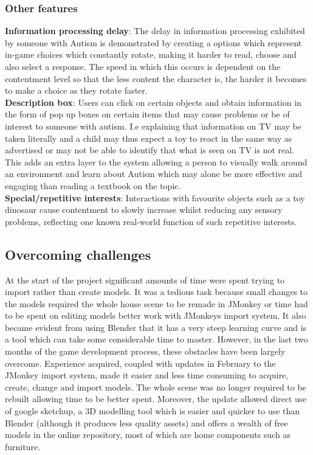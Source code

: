 \documentclass[11pt]{report}
\begin{document}
\subsubsection{Other features}
\textbf{Information processing delay}: The delay in information processing exhibited by someone with Autism is demonstrated by creating a options which represent in-game choices which constantly rotate, making it harder
to read, choose and also select a response. The speed in which this occurs is dependent on the contentment level so that the less content the character is, the harder it becomes to make a choice as they rotate faster. \\

\textbf{Description box}: Users can click on certain objects and obtain information in the form of pop up boxes on certain items that may cause problems or be of interest to someone with autism. I.e explaining that information on
TV may be taken literally and a child may thus expect a toy to react in the same way as advertised or may not be able to identify that what is seen on TV is not real. This adds an extra layer to the system allowing a person
to visually walk around an environment and learn about Autism which may alone be more effective and engaging than reading a textbook on the topic. \\

\textbf{Special/repetitive interests}: Interactions with favourite objects such as a toy dinosaur cause contentment to slowly increase whilst reducing any sensory problems, reflecting one known real-world function of such repetitive interests.

\subsection{Overcoming challenges}
At the start of the project significant amounts of time were spent trying to import rather than create models. It was a tedious task because small changes to the models required the whole house scene to be remade in JMonkey or
time had to be spent on editing models better work with JMonkeys import system. It also became evident from using Blender that it has a very steep learning curve and is a tool which can take some considerable time to master.
However, in the last two months of the game development process, these obstacles have been largely overcome. Experience acquired, coupled with updates in February to the JMonkey import system, made it easier and less
time consuming to acquire, create, change and import models. The whole scene was no longer required to be rebuilt allowing time to be better spent. Moreover, the update allowed direct use of google sketchup, a 3D modelling
tool which is easier and quicker to use than Blender (although it produces less quality assets) and offers a wealth of free models in the online repository, most of which are home components such as furniture.
\end{document}

